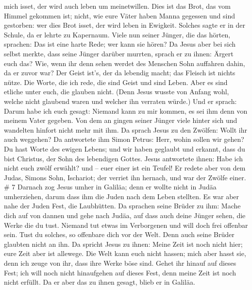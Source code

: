 mich isset, der wird auch leben um meinetwillen.  Dies ist
das Brot, das vom Himmel gekommen ist; nicht, wie eure Väter haben Manna
gegessen und sind gestorben: wer dies Brot isset, der wird leben in
Ewigkeit.  Solches sagte er in der Schule, da er lehrte zu
Kapernaum.  Viele nun seiner Jünger, die das hörten,
sprachen: Das ist eine harte Rede; wer kann sie hören?  Da
Jesus aber bei sich selbst merkte, dass seine Jünger darüber murrten,
sprach er zu ihnen: Ärgert euch das?  Wie, wenn ihr denn
sehen werdet des Menschen Sohn auffahren dahin, da er zuvor war?
 Der Geist ist's, der da lebendig macht; das Fleisch ist
nichts nütze. Die Worte, die ich rede, die sind Geist und sind Leben.
 Aber es sind etliche unter euch, die glauben nicht. (Denn
Jesus wusste von Anfang wohl, welche nicht glaubend waren und welcher
ihn verraten würde.)  Und er sprach: Darum habe ich euch
gesagt: Niemand kann zu mir kommen, es sei ihm denn von meinem Vater
gegeben.  Von dem an gingen seiner Jünger viele hinter sich
und wandelten hinfort nicht mehr mit ihm.  Da sprach Jesus
zu den Zwölfen: Wollt ihr auch weggehen?  Da antwortete ihm
Simon Petrus: Herr, wohin sollen wir gehen? Du hast Worte des ewigen
Lebens;  und wir haben geglaubt und erkannt, dass du bist
Christus, der Sohn des lebendigen Gottes.  Jesus antwortete
ihnen: Habe ich nicht euch zwölf erwählt? und -- euer einer ist ein
Teufel!  Er redete aber von dem Judas, Simons Sohn,
Ischariot; der verriet ihn hernach, und war der Zwölfe einer. \# 7
 Darnach zog Jesus umher in Galiläa; denn er wollte nicht in
Judäa umherziehen, darum dass ihm die Juden nach dem Leben stellten.
 Es war aber nahe der Juden Fest, die Laubhütten.
 Da sprachen seine Brüder zu ihm: Mache dich auf von dannen
und gehe nach Judäa, auf dass auch deine Jünger sehen, die Werke die du
tust.  Niemand tut etwas im Verborgenen und will doch frei
offenbar sein. Tust du solches, so offenbare dich vor der Welt.
 Denn auch seine Brüder glaubten nicht an ihn. 
Da spricht Jesus zu ihnen: Meine Zeit ist noch nicht hier; eure Zeit
aber ist allewege.  Die Welt kann euch nicht hassen; mich
aber hasst sie, denn ich zeuge von ihr, dass ihre Werke böse sind.
 Gehet ihr hinauf auf dieses Fest; ich will noch nicht
hinaufgehen auf dieses Fest, denn meine Zeit ist noch nicht erfüllt.
 Da er aber das zu ihnen gesagt, blieb er in Galiläa.
